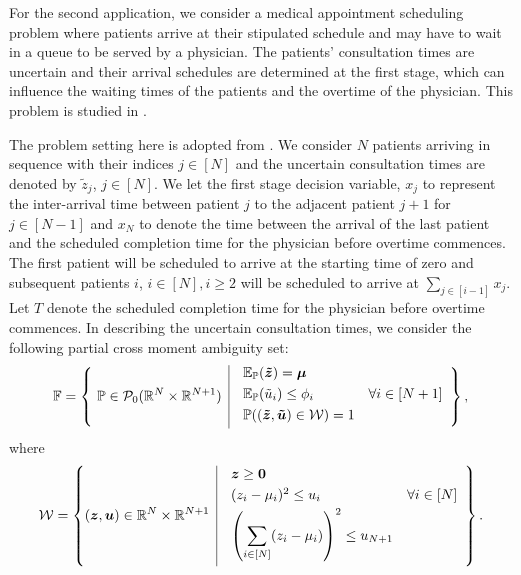 \documentclass[fleqn,mnsc,blindrev]{informs4}
\newcommand{\mb}[1]{\mbox{\boldmath \ensuremath{#1}}}
\newcommand{\mbt}[1]{\mb{\tilde{#1}}}
\renewcommand{\Re}{\mathbb{R}}
\begin{document}
		For the second application, we consider a medical appointment scheduling problem where patients arrive at their stipulated schedule and may have to wait in a queue to be served by a physician.  The patients' consultation times are uncertain and their arrival schedules are determined at the first stage, which can influence the waiting times of the patients and the overtime of the physician. This problem is studied in \cite{kltz13, mrz14, bsz17}.
		
		The problem setting here is adopted from \cite{bsz17}. We consider $N$ patients arriving in sequence with their indices $j \in [N]$ and the uncertain consultation times are denoted by $\tilde{z}_j$, $j \in [N]$.
		We let the first stage decision variable, $x_j$ to represent the  inter-arrival time between patient $j$ to the adjacent patient $j+1$ for $j\in [N-1]$ and $x_{N}$ to denote the time between the arrival of the last patient   and the scheduled completion time for the physician before overtime commences. The first patient will be scheduled to arrive at the starting time of zero and  subsequent patients  $i$, $i \in [N], i\geq 2$ will be scheduled to arrive at  $\sum_{j \in[i-1]}x_j$. Let $T$ denote the scheduled completion time for the physician before overtime commences. In describing the uncertain consultation times, we consider the following partial cross moment ambiguity set:
\begin{equation*}
		\mathbb{F} = \left\{ \ \mathbb{P}\in\mathcal{P}_0(\Re^{N}\times \Re^{N+1}) \enskip \vline \enskip
		\begin{array}{ll}
		\mathbb{E}_{\mathbb{P}}(\mbt{z}) = \mb{\mu} \vspace{3pt}\\
		\mathbb{E}_{\mathbb{P}}(\tilde{u}_i) \leq  \phi_i & \forall i \in [N+1] \vspace{3pt}\\
		\mathbb{P}( (\mbt{z}, \mbt{u})\in \mathcal{W}) = 1 \vspace{3pt}
		\end{array}
		\right\},
\end{equation*}
		where
\begin{equation*}
			\label{eq:W3set}
			\mathcal{W} = \left\{ (\mb{z}, \mb{u})\in \Re^{N}\times\Re^{N+1} \enskip \vline \enskip
			\begin{array}{ll}
				\mb{z} \geq \mb{0}  \vspace{3pt}\\
				(z_i-\mu_i)^2 \leq u_i& \forall i \in [N]  \vspace{3pt}\\
				\displaystyle  \left(\sum_{i\in [N]}(z_i - \mu_i)\right)^2 \leq u_{N+1} \vspace{3pt}
			\end{array}
			\right\}.
\end{equation*}
\end{document}
